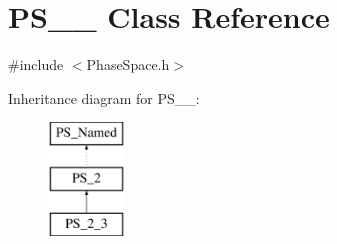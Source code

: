 \hypertarget{classPS__2__3}{\section{P\-S\-\_\-\_ Class Reference}
\label{classPS__2__3}
}


{\ttfamily \#include $<$Phase\-Space.\-h$>$}

Inheritance diagram for P\-S\-\_\-\_\-:\begin{figure}[H]
\begin{center}
\leavevmode
\includegraphics[height=3.000000cm]{classPS__2__3}
\end{center}
\end{figure}
